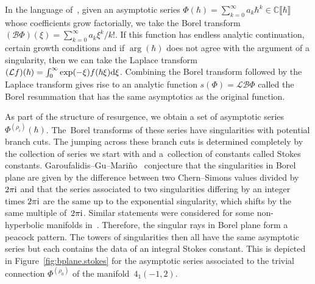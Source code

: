\documentclass[pdftex]{sigma}
\numberwithin{equation}{section}
\def\BC{\mathbb{C}}
\def\Bor{\mathcal{B}}
\def\Lap{\mathcal{L}}
\def\BC{\mathbb C}
\def\Bor{\mathcal{B}}
\def\Lap{\mathcal{L}}
\begin{document}
In the language of~\cite{GGM:I}, given an asymptotic series $\Phi(\hbar)=\sum_{k=0}^{\infty}a_{k}\hbar^{k}\in\BC\llbracket\hbar\rrbracket$ whose coefficients grow factorially, we take the Borel transform $(\Bor\Phi)(\xi)=\sum_{k=0}^{\infty}a_{k}\xi^{k}/k!$. If this function has endless analytic continuation, certain growth conditions and if $\arg(\hbar)$ does not agree with the argument of a singularity, then we can take the Laplace transform $(\Lap f)(\hbar)=\int_{0}^{\infty}\exp(-\xi)f(\hbar\xi){\rm d}\xi$. Combining the Borel transform followed by the Laplace transform gives rise to an analytic function $s(\Phi)=\Lap\Bor\Phi$ called the Borel resummation that has the same asymptotics as the original function.

As part of the structure of resurgence, we obtain a set of asymptotic series $\Phi^{(\rho_{i})}(\hbar)$. The~Borel transforms of these series have singularities with potential branch cuts. The jumping across these branch cuts is determined completely by the collection of series we start with and a~collection of constants called Stokes constants. Garoufalidis--Gu--Mari\~no~\cite{Gar:resCS,GGM:I} conjecture that the singularities in Borel plane are given by the difference between two Chern--Simons values divided by $2\pi {\rm i}$ and that the series associated to two singularities differing by an integer times $2\pi {\rm i}$ are the same up to the exponential singularity, which shifts by the same multiple of~$2\pi {\rm i}$. Similar statements were considered for some non-hyperbolic manifolds in~\cite{AM:res,CG:KZser}. Therefore, the singular rays in Borel plane form a peacock pattern. The towers of singularities then all have the same asymptotic series but each contains the data of an integral Stokes constant. This is depicted in Figure~\ref{fig:bplane.stokes} for the asymptotic series associated to the trivial connection $\Phi^{(\rho_{0})}$ of the manifold~$4_1(-1,2)$.
\end{document}
